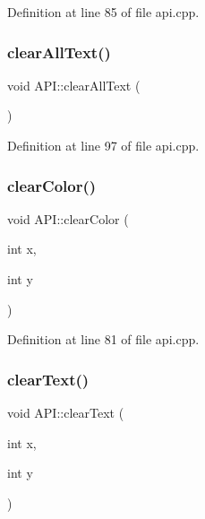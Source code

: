 Definition at line 85 of file api.\+cpp.

\mbox{\label{class_a_p_i_a212ef41a4d954a80cd08f462fdb9f631}} 
\subsubsection{\texorpdfstring{clear\+All\+Text()}{clearAllText()}}
{\footnotesize\ttfamily void A\+P\+I\+::clear\+All\+Text (\begin{DoxyParamCaption}{ }\end{DoxyParamCaption})\hspace{0.3cm}{\ttfamily [static]}}



Definition at line 97 of file api.\+cpp.

\mbox{\label{class_a_p_i_ae5c04edd8e44f455ac6bf8a19c2ba282}} 
\subsubsection{\texorpdfstring{clear\+Color()}{clearColor()}}
{\footnotesize\ttfamily void A\+P\+I\+::clear\+Color (\begin{DoxyParamCaption}\item[{int}]{x,  }\item[{int}]{y }\end{DoxyParamCaption})\hspace{0.3cm}{\ttfamily [static]}}



Definition at line 81 of file api.\+cpp.

\mbox{\label{class_a_p_i_a0937e059fff7d9543187765500fa4968}} 
\subsubsection{\texorpdfstring{clear\+Text()}{clearText()}}
{\footnotesize\ttfamily void A\+P\+I\+::clear\+Text (\begin{DoxyParamCaption}\item[{int}]{x,  }\item[{int}]{y }\end{DoxyParamCaption})\hspace{0.3cm}{\ttfamily [static]}}



